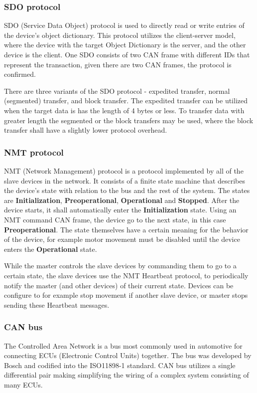 \subsubsection{SDO protocol}
SDO (Service Data Object) protocol is used to directly read or write entries of the device's object dictionary.
This protocol utilizes the client-server model, where the device with the target Object Dictionary is the server, and the other device is the client.
One SDO consists of two CAN frame with different IDs that represent the transaction, given there are two CAN frames, the protocol is confirmed\cite{cia}.

There are three variants of the SDO protocol - expedited transfer, normal (segmented) transfer, and block transfer.
The expedited transfer can be utilized when the target data is has the length of 4 bytes or less.
To transfer data with greater length the segmented or the block transfers may be used, where the block transfer shall have a slightly lower protocol overhead\cite{wiki_canopen}.

\subsubsection{NMT protocol}
NMT (Network Management) protocol is a protocol implemented by all of the slave devices in the network.
It consists of a finite state machine that describes the device's state with relation to the bus and the rest of the system.
The states are \textbf{Initialization}, \textbf{Preoperational}, \textbf{Operational} and \textbf{Stopped}.
After the device starts, it shall automatically enter the \textbf{Initialization} state.
Using an NMT command CAN frame, the device go to the next state, in this case \textbf{Preoperational}.
The state themselves have a certain meaning for the behavior of the device, for example motor movement must be disabled until the device enters the \textbf{Operational} state.

While the master controls the slave devices by commanding them to go to a certain state, the slave devices use the NMT Heartbeat protocol, to periodically notify the master (and other devices) of their current state.
Devices can be configure to for example stop movement if another slave device, or master stops sending these Heartbeat messages.

\subsubsection{CAN bus}
The Controlled Area Network is a bus most commonly used in automotive for connecting ECUs (Electronic Control Units) together.
The bus was developed by Bosch and codified into the ISO11898-1 standard\cite{}.
CAN bus utilizes a single differential pair making simplifying the wiring of a complex system consisting of many ECUs.

